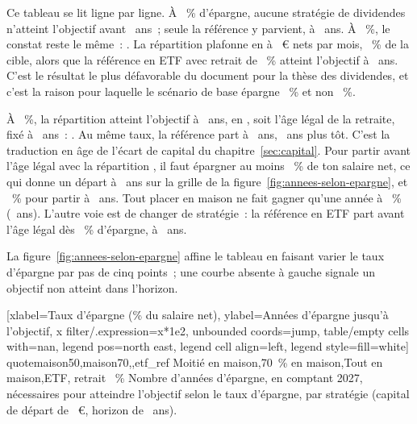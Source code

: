 Ce tableau se lit ligne par ligne. \`A \SparquoteZehn~\% d'\'epargne, aucune strat\'egie de dividendes
n'atteint l'objectif avant \AlterHorizon~ans~; seule la r\'ef\'erence y parvient, \`a
\AlterEtfReferenzZehn~ans. \`A \SparquoteZwanzig~\%, le constat reste le m\^eme~: . La
r\'epartition \ReferenzStrategie{} plafonne en \AnneeHorizonFin{} \`a \RevenuHorizonZwanzig~€ nets par
mois, \RevenuHorizonZwanzigPartCible~\% de la cible, alors que la r\'ef\'erence en ETF avec retrait de
\TauxRetrait~\% atteint l'objectif \`a \AlterEtfReferenzZwanzig~ans. C'est le r\'esultat le plus
d\'efavorable du document pour la th\`ese des dividendes, et c'est la raison pour laquelle le
sc\'enario de base \'epargne \ReferenzSparquote~\% et non \SparquoteZwanzig~\%.

\`A \ReferenzSparquote~\%, la r\'epartition \ReferenzStrategie{} atteint l'objectif \`a
\AlterYannBasis~ans, en \AnneeYannBasis, soit l'\^age l\'egal de la retraite, fix\'e \`a
\AgeLegal~ans~: . Au m\^eme taux, la r\'ef\'erence part \`a
\AlterEtfBasis~ans, \EcartAgeEtfMaisonBasis~ans plus t\^ot. C'est la traduction en \^age de l'\'ecart
de capital du chapitre~\ref{sec:capital}. Pour partir avant l'\^age l\'egal avec la r\'epartition
\ReferenzStrategie{}, il faut \'epargner au moins \QuoteAnticipeeMaisonSiebzig~\% de ton salaire net,
ce qui donne un d\'epart \`a \AlterAnticipeeMaisonSiebzig~ans sur la grille de la
figure~\ref{fig:annees-selon-epargne}, et \SparquoteFuenfzig~\% pour partir \`a
\AlterMaisonSiebzigFuenfzig~ans. Tout placer en maison ne fait gagner qu'une ann\'ee \`a
\SparquoteDreissig~\% (\AlterMaisonHundertDreissig~ans). L'autre voie est de changer de strat\'egie~:
la r\'ef\'erence en ETF part avant l'\^age l\'egal d\`es \QuoteAnticipeeEtfReferenz~\% d'\'epargne,
\`a \AlterAnticipeeEtfReferenz~ans.

La figure~\ref{fig:annees-selon-epargne} affine le tableau en faisant varier le taux d'\'epargne par
pas de cinq points~; une courbe absente \`a gauche signale un objectif non atteint dans l'horizon.

[xlabel={Taux d'\'epargne (\% du salaire net)},
  ylabel={Ann\'ees d'\'epargne jusqu'\`a l'objectif},
  x filter/.expression={x*1e2}, unbounded coords=jump,
  table/empty cells with={nan}, legend pos=north east, legend cell align=left, legend style={fill=white}]%
  {quote}{maison50,maison70,\ColonneToutMaison,etf_ref}%
  {{Moiti\'e en maison},{70~\% en maison},{Tout en maison},{ETF, retrait \TauxRetrait~\%}}%
  {Nombre d'ann\'ees d'\'epargne, en comptant 2027, n\'ecessaires pour atteindre l'objectif selon le
  taux d'\'epargne, par strat\'egie (capital de d\'epart de \KapitalDepartMitte~€, horizon de
  \HorizonJahre~ans).\label{fig:annees-selon-epargne}}

